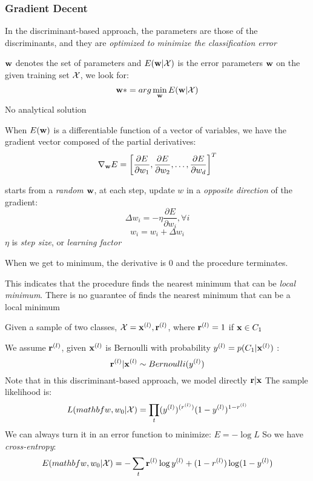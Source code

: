         \subsubsection{Gradient Decent}
    In the discriminant-based approach, the parameters are those of the
        discriminants, and they are \emph{optimized to minimize the
        classification error}
        \begin{description}
    \item[Error]$\mathbf{w}$ denotes the set of parameters and $E(\mathbf{w}|\mathcal{X})$ is the
        error parameters $\mathbf{w}$ on the given training set 
        $\mathcal{X}$, we look for: 
        \[ \mathbf{w}*= arg\min_{\mathbf{w}}E(\mathbf{w}|\mathcal{X})\]
        No analytical solution
    \item[Gradient Vector] When $E(\mathbf{w})$ is a differentiable function of a
        vector of variables, we have the gradient vector composed of the
           partial derivatives:
            \[ \nabla_{\mathbf{w}} E = \left[ \frac{\partial E}{\partial w_1},
                \frac{\partial E}{\partial w_2}, \dots, \frac{\partial
                E}{\partial w_d} \right]^T
                \]
            \item [Gradient Descent] starts from a \emph{random} $\mathbf{w}$, at each
                step, update $w$ in a \emph{opposite direction} of the gradient:
                \[\Delta w_i = - \eta\frac{\partial E}{\partial w_i}, \forall i
                    \]
                \[ w_i = w_i + \Delta w_i \]
                $\eta$ is \emph{step size}, or \emph{learning factor}

                When we get to minimum, the derivative is 0 and the procedure
                terminates.

            \item This indicates that the procedure finds the nearest minimum
                that can be \emph{local minimum}. There is no guarantee of
                finds the nearest minimum that can be a local minimum
    \item [Learning parameters]
        Given a sample of two classes, $\mathcal{X} = {\mathbf{x}^{(l)}, \mathbf{r}^{(l)}}$, where $\mathbf{r}^{(l)}
        = 1$ if $\mathbf{x}\in C_1$

        We assume $\mathbf{r}^{(l)}$, given $\mathbf{x}^{(l)}$ is Bernoulli with probability $y^{(l)} =
        p(C_1|\mathbf{x}^{(l)})$ :
        \[\mathbf{r}^{(l)}|\mathbf{x}^{(l)} \sim Bernoulli(y^{(l)}) \]
        Note that in this discriminant-based approach, we model directly $\mathbf{r}|\mathbf{x}$
        The sample likelihood is:
        \[ L(mathbf{w},w_0|\mathcal{X}) = \prod_t(y^{(l)})^{(r^{(l)})}(1-y^{(l)})^{1-r^{(l)}}
            \]
        We can always turn it in an error function to minimize: $E = -\log L$
        So we have \emph{cross-entropy}:
        \[ E(mathbf{w}, w_0| \mathcal{X}) = -\sum_t \mathbf{r}^{(l)}\log y^{(l)} + (1-r^{(l)})\log(1 - y^{(l)}) \]


\end{description}
